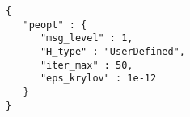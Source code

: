 \begin{lstlisting}[style=json,caption={PEOpt uses this input specification to minimize the Rosenbrock function in Listing \ref{lst:Rosen}.  We explain this specification Chapter \ref{ch:Input}.},label=lst:RosenJSON]
{
   "peopt" : {
      "msg_level" : 1,
      "H_type" : "UserDefined",
      "iter_max" : 50,
      "eps_krylov" : 1e-12
   }
}
\end{lstlisting}
